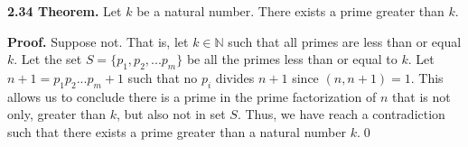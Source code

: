 \documentclass[12pt]{article}
\begin{document}
\noindent\textbf{2.34 Theorem.} Let $k$ be a natural number. There exists a prime greater than $k$.

\bigskip

\noindent\textbf{Proof.} Suppose not. That is, let $k\in\mathbb{N}$ such that all primes are less than or equal $k$. Let the set $S=\{p_1,p_2,...p_m\}$ be all the primes less than or equal to $k$. Let $n+1=p_1p_2...p_m+1$ such that no $p_i$ divides $n+1$ since $(n,n+1)=1$. This allows us to conclude there is a prime in the prime factorization of $n$ that is not only, greater than $k$, but also not in set $S$. Thus, we have reach a contradiction such that there exists a prime greater than a natural number $k$.\qed
\end{document}
